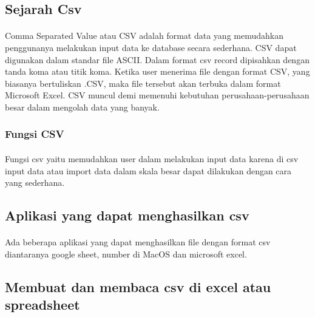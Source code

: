 \subsection{Sejarah Csv}
\paragraph{}Comma Separated Value atau CSV adalah format data yang memudahkan penggunanya melakukan input data ke database secara sederhana. CSV dapat digunakan dalam standar file ASCII. Dalam format csv record dipisahkan dengan tanda koma atau titik koma. Ketika user menerima file dengan format CSV, yang biasanya bertuliskan .CSV, maka file tersebut akan terbuka dalam format Microsoft Excel. CSV muncul demi memenuhi kebutuhan perusahaan-perusahaan besar dalam mengolah data yang banyak.

\subsubsection{Fungsi CSV}
\paragraph{}Fungsi csv yaitu memudahkan user dalam melakukan input data karena di csv input data atau import data dalam skala besar dapat dilakukan dengan cara yang sederhana.
\subsection{Aplikasi yang dapat menghasilkan csv}
\paragraph{}Ada beberapa aplikasi yang dapat menghasilkan file dengan format csv diantaranya google sheet, number di MacOS dan microsoft excel.
\subsection{Membuat dan membaca csv di excel atau spreadsheet}
